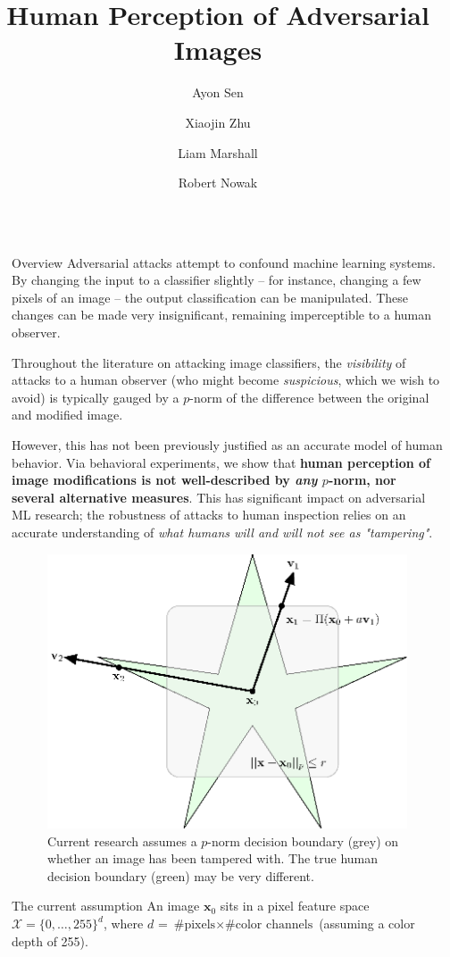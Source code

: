 \documentclass[final,notheorems]{beamer}
\title{Human Perception of Adversarial Images}
\author{Ayon Sen \inst{1} \and Xiaojin Zhu \inst{1} \and Liam Marshall \inst{1} \and Robert Nowak \inst{1}}
\institute[shortinst]{\inst{1} University of Wisconsin-Madison}
\newlength{\sepwidth}
\newlength{\colwidth}
\newcommand{\separatorcolumn}{\begin{column}{\sepwidth}\end{column}}
\def\bfx{\mathbf x}
\def\X{\mathcal X}
\begin{document}
\begin{frame}[t]
\begin{columns}[t]
\separatorcolumn

\begin{column}{\colwidth}
  \begin{block}{Overview}
    Adversarial attacks attempt to confound machine learning systems. By changing the input to a classifier slightly -- for instance, changing a few pixels of an image -- the output classification can be manipulated.
    These changes can be made very insignificant, remaining imperceptible to a human observer.

    Throughout the literature on attacking image classifiers, the \emph{visibility} of attacks to a human observer (who might become \emph{suspicious}, which we wish to avoid) is typically gauged by a $p$-norm of the difference between the original and modified image.

    However, this has not been previously justified as an accurate model of human behavior.
    Via behavioral experiments, we show that \textbf{human perception of image modifications is not well-described by \emph{any} $p$-norm, nor several alternative measures}.
    This has significant impact on adversarial ML research; the robustness of attacks to human inspection relies on an accurate understanding of \emph{what humans will and will not see as "tampering"}.

    \begin{figure}
      \includegraphics[width=.5\linewidth]{fig/intro_image-figure0.eps}
      \caption{Current research assumes a $p$-norm decision boundary (grey) on whether an image has been tampered with. The true human decision boundary (green) may be very different.}
      \label{fig:decision_boundary}
    \end{figure}
  \end{block}

  \begin{alertblock}{The current assumption}
    An image $\bfx_0$ sits in a pixel feature space $\X = \{0,\ldots,255\}^d$, where $d$ = $\text{\# pixels} \times \text{\# color channels}$ (assuming a color depth of 255).


\end{alertblock}
\end{column}
\end{columns}
\end{frame}
\end{document}
